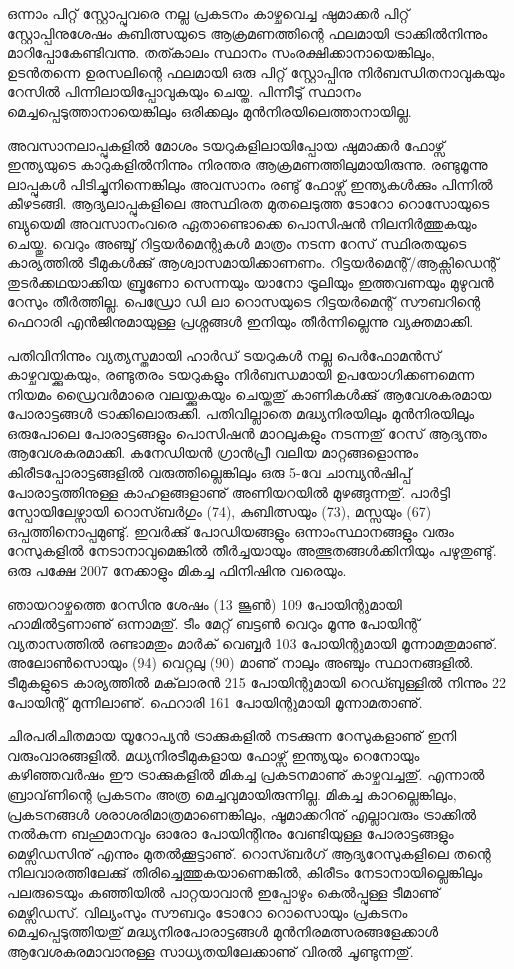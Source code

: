 ഒന്നാം പിറ്റ് സ്റ്റോപ്പുവരെ നല്ല പ്രകടനം കാഴ്ചവെച്ച ഷുമാക്കര്‍ പിറ്റ് സ്റ്റോപ്പിനുശേഷം കുബിത്സയുടെ ആക്രമണത്തിന്റെ 
ഫലമായി ട്രാക്കില്‍നിന്നും മാറിപ്പോകേണ്ടിവന്നു. തത്കാലം സ്ഥാനം സംരക്ഷിക്കാനായെങ്കിലും, ഉടന്‍തന്നെ 
ഉരസലിന്റെ ഫലമായി ഒരു പിറ്റ് സ്റ്റോപ്പിനു നിര്‍ബന്ധിതനാവുകയും റേസില്‍ പിന്നിലായിപ്പോവുകയും ചെയ്ത. പിന്നീടു് 
സ്ഥാനം മെച്ചപ്പെടുത്താനായെങ്കിലും ഒരിക്കലും മുന്‍നിരയിലെത്താനായില്ല.

അവസാനലാപ്പുകളില്‍ മോശം ടയറുകളിലായിപ്പോയ ഷുമാക്കര്‍ ഫോഴ്സ് ഇന്ത്യയുടെ കാറുകളില്‍നിന്നും നിരന്തര 
ആക്രമണത്തിലുമായിരുന്നു. രണ്ടുമൂന്നു ലാപ്പുകള്‍ പിടിച്ചുനിന്നെങ്കിലും അവസാനം രണ്ടു് ഫോഴ്സ് ഇന്ത്യകള്‍ക്കും പിന്നില്‍ 
കീഴടങ്ങി. ആദ്യലാപ്പുകളിലെ അസ്ഥിരത മുതലെടുത്ത ടോറോ റൊസോയുടെ ബ്യുയെമി അവസാനംവരെ 
ഏതാണ്ടൊക്കെ പൊസിഷന്‍ നിലനിര്‍ത്തുകയും ചെയ്തു. വെറും അഞ്ചു് റിട്ടയര്‍മെന്റുകള്‍ മാത്രം നടന്ന റേസ് 
സ്ഥിരതയുടെ കാര്യത്തില്‍ ടീമുകള്‍ക്കു് ആശ്വാസമായിക്കാണണം. റിട്ടയര്‍മെന്റ്/ആക്സിഡെന്റ് തുടര്‍ക്കഥയാക്കിയ 
ബ്രൂണോ സെന്നയും യാനോ ട്രൂലിയും ഇത്തവണയും മുഴുവന്‍ റേസും തീര്‍ത്തില്ല. പെഡ്രോ ഡി ലാ റൊസയുടെ 
റിട്ടയര്‍മെന്റ് സൗബറിന്റെ ഫെറാരി എന്‍ജിനുമായുള്ള പ്രശ്നങ്ങള്‍ ഇനിയും തീര്‍ന്നില്ലെന്നു വ്യക്തമാക്കി.

പതിവിനിന്നും വ്യത്യസ്തമായി ഹാര്‍ഡ് ടയറുകള്‍ നല്ല പെര്‍ഫോമന്‍സ് കാഴ്ചവയ്ക്കുകയും, രണ്ടുതരം ടയറുകളും 
നിര്‍ബന്ധമായി ഉപയോഗിക്കണമെന്ന നിയമം ഡ്രൈവര്‍മാരെ വലയ്ക്കുകയും ചെയ്തതു് കാണികള്‍ക്കു് ആവേശകരമായ 
പോരാട്ടങ്ങള്‍ ട്രാക്കിലൊരുക്കി. പതിവില്ലാതെ മദ്ധ്യനിരയിലും മുന്‍നിരയിലും ഒരുപോലെ പോരാട്ടങ്ങളും പൊസിഷന്‍ 
മാറലുകളും നടന്നതു് റേസ് ആദ്യന്തം ആവേശകരമാക്കി. കനേഡിയന്‍ ഗ്രാന്‍പ്രീ വലിയ മാറ്റങ്ങളൊന്നും 
കിരീടപ്പോരാട്ടങ്ങളില്‍ വരുത്തില്ലെങ്കിലും ഒരു 5-വേ ചാമ്പ്യന്‍ഷിപ്പ് പോരാട്ടത്തിനുള്ള കാഹളങ്ങളാണു് അണിയറയില്‍ മുഴങ്ങുന്നതു്. 
പാര്‍ട്ടി സ്പോയിലേഴ്സായി റൊസ്ബര്‍ഗും (74), കുബിത്സയും (73), മസ്സയും (67) ഒപ്പത്തിനൊപ്പമുണ്ടു്. 
ഇവര്‍ക്കു് പോഡിയങ്ങളും ഒന്നാംസ്ഥാനങ്ങളും വരും റേസുകളില്‍ നേടാനാവുമെങ്കില്‍ തീര്‍ച്ചയായും അത്ഭുതങ്ങള്‍ക്കിനിയും
പഴുതുണ്ടു്. ഒരു പക്ഷേ 2007 നേക്കാളും മികച്ച ഫിനിഷിനു വരെയും.

ഞായറാഴ്ചത്തെ റേസിനു ശേഷം (13 ജൂണ്‍) 109 പോയിന്റുമായി ഹാമില്‍ട്ടണാണു് ഒന്നാമതു്. ടീം മേറ്റ് ബട്ടണ്‍ വെറും 
മൂന്നു പോയിന്റ് വ്യതാസത്തില്‍ രണ്ടാമതും മാര്‍ക് വെബ്ബര്‍ 103 പോയിന്റുമായി മൂന്നാമതുമാണു്. അലോണ്‍സൊയും (94) വെറ്റലു (90) മാണു് 
നാലും അഞ്ചും സ്ഥാനങ്ങളില്‍. ടീമുകളുടെ കാര്യത്തില്‍ മക്‌ലാരന്‍ 215 പോയിന്റുമായി 
റെഡ്ബുള്ളില്‍ നിന്നും 22 പോയിന്റ് മുന്നിലാണു്. ഫെറാരി 161 പോയിന്റുമായി മൂന്നാമതാണു്.

ചിരപരിചിതമായ യൂറോപ്യന്‍ ട്രാക്കുകളില്‍ നടക്കുന്ന റേസുകളാണു് ഇനി വരുംവാരങ്ങളില്‍. മധ്യനിരടീമുകളായ ഫോഴ്സ്
ഇന്ത്യയും റെനോയും കഴിഞ്ഞവര്‍ഷം ഈ ട്രാക്കുകളില്‍ മികച്ച പ്രകടനമാണു് കാഴ്ചവച്ചതു്. എന്നാല്‍ ബ്രാവ്‌ണിന്റെ 
പ്രകടനം അത്ര മെച്ചവുമായിരുന്നില്ല. മികച്ച കാറല്ലെങ്കിലും, പ്രകടനങ്ങള്‍ ശരാശരിമാത്രമാണെങ്കിലും, ഷൂമാക്കറിനു് 
എല്ലാവരും ട്രാക്കില്‍ നല്‍കുന്ന ബഹുമാനവും ഓരോ പോയിന്റിനും വേണ്ടിയുള്ള പോരാട്ടങ്ങളും മെഴ്സിഡസിനു് എന്നും 
മുതല്‍ക്കൂട്ടാണു്. റൊസ്ബര്‍ഗ് ആദ്യറേസുകളിലെ തന്റെ നിലവാരത്തിലേക്കു് തിരിച്ചെത്തുകയാണെങ്കില്‍, കിരീടം 
നേടാനായില്ലെങ്കിലും പലരുടെയും കഞ്ഞിയില്‍ പാറ്റയാവാന്‍ ഇപ്പോഴും കെല്‍പ്പുള്ള ടീമാണു് മെഴ്സിഡസ്. വില്യംസും 
സൗബറും ടോറോ റൊസൊയും പ്രകടനം മെച്ചപ്പെടുത്തിയതു് മദ്ധ്യനിരപോരാട്ടങ്ങള്‍ മുന്‍നിരമത്സരങ്ങളേക്കാള്‍ 
ആവേശകരമാവാനുള്ള സാധ്യതയിലേക്കാണു് വിരല്‍ ചൂണ്ടുന്നതു്.

